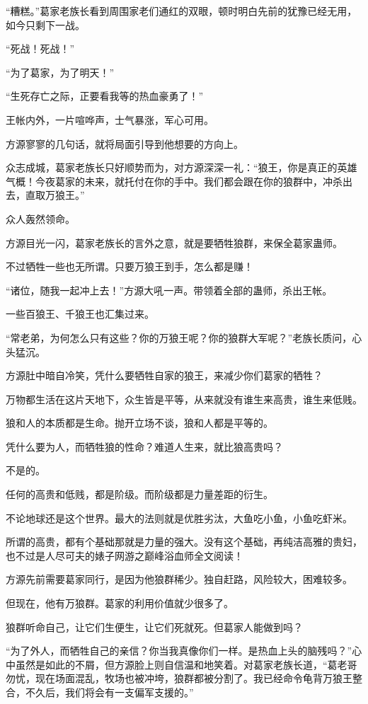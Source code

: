 \begin{this_body}
“糟糕。”葛家老族长看到周围家老们通红的双眼，顿时明白先前的犹豫已经无用，如今只剩下一战。

“死战！死战！”

“为了葛家，为了明天！”

“生死存亡之际，正要看我等的热血豪勇了！”

王帐内外，一片喧哗声，士气暴涨，军心可用。

方源寥寥的几句话，就将局面引导到他想要的方向上。

众志成城，葛家老族长只好顺势而为，对方源深深一礼：“狼王，你是真正的英雄气概！今夜葛家的未来，就托付在你的手中。我们都会跟在你的狼群中，冲杀出去，直取万狼王。”

众人轰然领命。

方源目光一闪，葛家老族长的言外之意，就是要牺牲狼群，来保全葛家蛊师。

不过牺牲一些也无所谓。只要万狼王到手，怎么都是赚！

“诸位，随我一起冲上去！”方源大吼一声。带领着全部的蛊师，杀出王帐。

一些百狼王、千狼王也汇集过来。

“常老弟，为何怎么只有这些？你的万狼王呢？你的狼群大军呢？”老族长质问，心头猛沉。

方源肚中暗自冷笑，凭什么要牺牲自家的狼王，来减少你们葛家的牺牲？

万物都生活在这片天地下，众生皆是平等，从来就没有谁生来高贵，谁生来低贱。

狼和人的本质都是生命。抛开立场不谈，狼和人都是平等的。

凭什么要为人，而牺牲狼的性命？难道人生来，就比狼高贵吗？

不是的。

任何的高贵和低贱，都是阶级。而阶级都是力量差距的衍生。

不论地球还是这个世界。最大的法则就是优胜劣汰，大鱼吃小鱼，小鱼吃虾米。

所谓的高贵，都有个基础那就是力量的强大。没有这个基础，再纯洁高雅的贵妇，也不过是人尽可夫的婊子网游之巅峰浴血师全文阅读！

方源先前需要葛家同行，是因为他狼群稀少。独自赶路，风险较大，困难较多。

但现在，他有万狼群。葛家的利用价值就少很多了。

狼群听命自己，让它们生便生，让它们死就死。但葛家人能做到吗？

“为了外人，而牺牲自己的亲信？你当我真像你们一样。是热血上头的脑残吗？”心中虽然是如此的不屑，但方源脸上则自信温和地笑着。对葛家老族长道，“葛老哥勿忧，现在场面混乱，牧场也被冲垮，狼群都被分割了。我已经命令龟背万狼王整合，不久后，我们将会有一支偏军支援的。”


\end{this_body}
